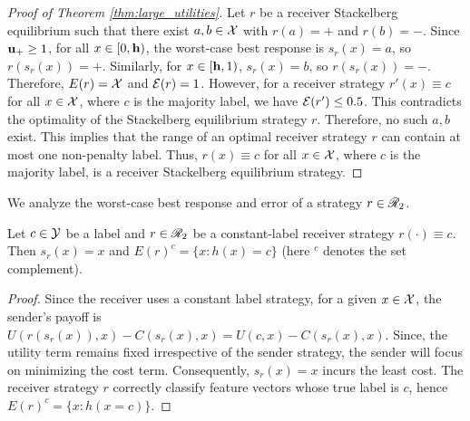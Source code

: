 \begin{proof}[Proof of Theorem \ref{thm:large_utilities}]\label{proof:large_utilities}
Let $r$ be a receiver Stackelberg equilibrium such that there exist $a, b \in \mathcal{X}$ with $r(a) = \plus$ and $r(b) = \minus$. Since $\mathbf{u_+} \ge 1$, for all $x \in [0, \mathbf{h})$, the worst-case best response is $s_r(x) = a$, so $r(s_r(x)) = \plus$. Similarly, for $x \in [\mathbf{h}, 1)$, $s_r(x) = b$, so $r(s_r(x)) = \minus$. Therefore, $E(r) = \mathcal{X}$ and $\mathcal{E}(r) = 1$.
However, for a receiver strategy $r'(x) \equiv c$ for all $x \in \mathcal{X}$, where $c$ is the majority label, we have $\mathcal{E}(r') \le 0.5$. This contradicts the optimality of the Stackelberg equilibrium strategy $r$. Therefore, no such $a, b$ exist. This implies that the range of an optimal receiver strategy $r$ can contain at most one non-penalty label. Thus, $r(x) \equiv c$ for all $x \in \mathcal{X}$, where $c$ is the majority label, is a receiver Stackelberg equilibrium strategy.
\end{proof}

We analyze the worst-case best response and error of a strategy $r \in \mathscr{R}_2$.

\begin{lem}\label{lem:constant strategy}
	Let $c \in \mathcal{Y}$ be a label and $r \in \mathscr{R}_2$ be a constant-label  receiver strategy $r(\cdot) \equiv c$. Then $s_r(x) = x$ and $E(r)^c = \{x: h(x) =c\}$ (here $^c$ denotes the set complement).
\end{lem}

\begin{proof}
	Since the receiver uses a constant label strategy, for a given $x \in \mathcal{X}$, the sender's payoff is $U(r(s_r(x)),x) - C(s_r(x),x) = U(c,x) - C(s_r(x),x)$.
	Since, the utility term remains fixed irrespective of the sender strategy, the sender will focus on minimizing the cost term. Consequently, $s_r(x) = x$ incurs the least cost. The receiver strategy $r$ correctly classify feature vectors whose true label is $c$, hence $E(r)^c = \{x:h(x = c)\}$.
\end{proof}


